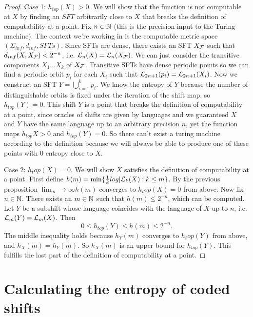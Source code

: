 \documentclass[11pt, reqno]{amsart}
\theoremstyle{plain}
\numberwithin{thm}{subsection}
\theoremstyle{definition}
\begin{document}
\begin{proof}
  Case 1: $h_{top}(X) > 0$. We will show that the function is not computable at $X$ by finding an $SFT$ arbitrarily close to $X$ that breaks the definition of computability at a point. Fix $n \in \mathbb{N}$ (this is the precision input to the Turing machine). The context we're working in is the computable metric space $(\Sigma_{inf}, d_{inf}, SFTs)$. Since SFTs are dense, there exists an SFT $X_{\mathcal{F}}$ such that $d_{inf}(X, X_{\mathcal{F}}) < 2^{-n}$, i.e. $\mathcal{L}_n(X) = \mathcal{L}_n(X_{\mathcal{F}})$. We can just consider the transitive components $X_1 \dots X_k$ of $X_{\mathcal{F}}$. Transitive SFTs have dense periodic points so we can find a periodic orbit $p_i$ for each $X_i$ such that $\mathcal{L}_{2n+1}(p_i) = \mathcal{L}_{2n+1}(X_i)$. Now we construct an SFT $Y = \bigcup_{i=1}^k p_i$. We know the entropy of $Y$ because the number of distinguishable orbits is fixed under the iteration of the shift map, so $h_{top}(Y) = 0$. This shift $Y$ is a point that breaks the definition of computability at a point, since oracles of shifts are given by languages and we guaranteed $X$ and $Y$ have the same language up to an arbitrary precision $n$, yet the function maps $h_{top}{X} > 0$ and $h_{top}(Y) = 0$. So there can't exist a turing machine according to the definition because we will always be able to produce one of these points with $0$ entropy close to $X$.

  Case 2: $h_top(X) = 0$. We will show $X$ satisfies the definition of computability at a point. First define $h(m) = \min\{\frac{1}{k}log|\mathcal{L}_k(X) : k \leq m\}$. By the previous proposition $\lim_m \rightarrow \infty h(m)$ converges to $h_top(X) = 0$ from above. Now fix $n \in \mathbb{N}$. There exists an $m \in \mathbb{N}$ such that $h(m) \leq 2^{-n}$, which can be computed. Let $Y$ be a subshift whose language coincides with the language of $X$ up to $n$, i.e. $\mathcal{L}_m(Y) = \mathcal{L}_m(X)$. Then 
  $$0 \leq h_{top}(Y) \leq h(m) \leq 2^{-n}.$$
  The middle inequality holds because $h_Y(m)$ converges to $h_top(Y)$ from above, and $h_X(m) = h_Y(m)$. So $h_X(m)$ is an upper bound for $h_{top}(Y)$. This fulfills the last part of the definition of computability at a point. 
\end{proof}




\newpage
\section{Calculating the entropy of coded shifts}
\end{document}
